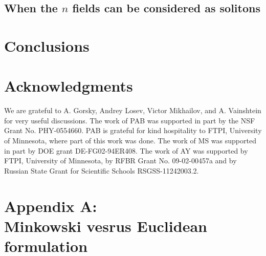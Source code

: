 \documentclass[epsfig,12pt]{article}
\renewcommand{\theequation}{\thesection.\arabic{equation}}
\renewcommand{\theequation}{\thesection.\arabic{equation}}
\begin{document}
{\subsection{When the $n$ fields can be considered as solitons}
\label{wnfcbc}


\newpage

\section{Conclusions}


\section*{Acknowledgments}

We are grateful to A. Gorsky, Andrey Losev, Victor Mikhailov, and A. Vainshtein 
for very useful discussions.
The work of PAB was supported in part by the NSF Grant No. PHY-0554660. 
PAB is grateful for kind hospitality to FTPI, University of Minnesota, where part of this work was done. 
The work of MS was supported in part by DOE grant DE-FG02-94ER408. 
The work of AY was  supported 
by  FTPI, University of Minnesota, 
by RFBR Grant No. 09-02-00457a 
and by Russian State Grant for 
Scientific Schools RSGSS-11242003.2.


\newpage


\section*{Appendix A: \\
Minkowski vesrus Euclidean formulation}
 \renewcommand{\theequation}{A.\arabic{equation}}
\setcounter{equation}{0}
 
 \renewcommand{\thesubsection}{A.\arabic{subsection}}
\setcounter{subsection}{0}

}
\end{document}
